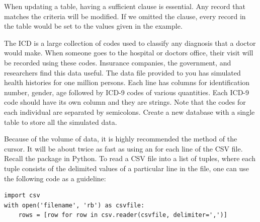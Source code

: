\begin{info}
When updating a table, having a sufficient  clause is essential.  Any record that matches the criteria will be modified.
If we omitted the  clause, every record in the table would be set to the values given in the example.
\end{info}

\begin{problem}
The ICD is a large collection of codes used to classify any diagnosis that a doctor would make.
When someone goes to the hospital or doctors office, their visit will be recorded using these codes.
Insurance companies, the government, and researchers find this data useful.
The data file provided to you has simulated health histories for one million persons.
Each line has columns for identification number, gender, age followed by ICD-9 codes of various quantities. Each ICD-9 code should have its own column and they are strings. Note that the codes for each individual are separated by semicolons.
Create a new database with a single table to store all the simulated data.

Because of the volume of data, it is highly recommended the  method of the cursor.
It will be about twice as fast as using an  for each line of the CSV file.
Recall the  package in Python. To read a CSV file into a list of tuples, where each tuple consists
of the delimited values of a particular line in the file, one can use the following code as a guideline:
\begin{lstlisting}
import csv
with open('filename', 'rb') as csvfile:
    rows = [row for row in csv.reader(csvfile, delimiter=',')]
\end{lstlisting}
\label{prob:icd9tables}
\end{problem}

